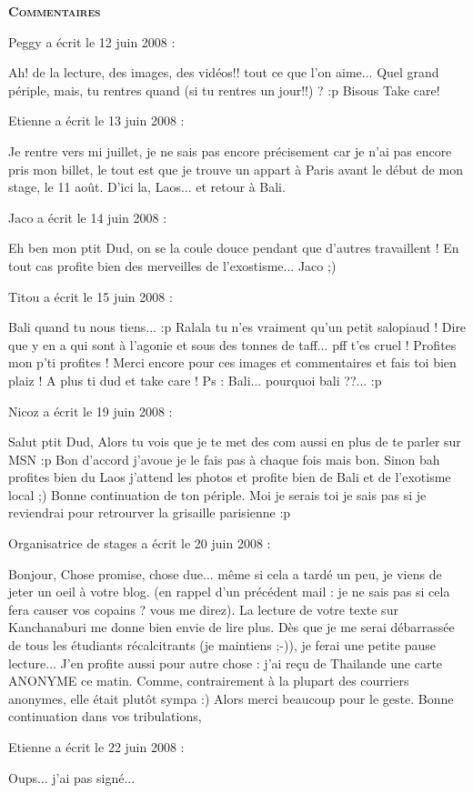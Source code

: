 \bigskip
\textbf{\textsc{Commentaires}}

\medskip
Peggy a écrit le 12 juin 2008 :
\begin{displayquote}
Ah! de la lecture, des images, des vidéos!! tout ce que l'on aime...
Quel grand périple, mais, tu rentres quand (si tu rentres un jour!!) ? :p
Bisous
Take care!
\end{displayquote}

\medskip
Etienne a écrit le 13 juin 2008 :
\begin{displayquote}
Je rentre vers mi juillet, je ne sais pas encore précisement car je n'ai pas encore pris mon billet, le tout est que je trouve un appart à Paris avant le début de mon stage, le 11 août.
D'ici la, Laos... et retour à Bali.
\end{displayquote}

\medskip
Jaco a écrit le 14 juin 2008 :
\begin{displayquote}
Eh ben mon ptit Dud, on se la coule douce pendant que d'autres travaillent !
En tout cas profite bien des merveilles de l'exostisme...
Jaco ;)
\end{displayquote}

\medskip
Titou a écrit le 15 juin 2008 :
\begin{displayquote}
Bali quand tu nous tiens... :p
Ralala tu n'es vraiment qu'un petit salopiaud ! Dire que y en a qui sont à l'agonie et sous des tonnes de taff... pff t'es cruel !
Profites mon p'ti profites !
Merci encore pour ces images et commentaires et fais toi bien plaiz !
A plus ti dud et take care !
Ps : Bali... pourquoi bali ??... :p
\end{displayquote}

\medskip
Nicoz a écrit le 19 juin 2008 :
\begin{displayquote}
Salut ptit Dud,
Alors tu vois que je te met des com aussi en plus de te parler sur MSN :p
Bon d'accord j'avoue je le fais pas à chaque fois mais bon.
Sinon bah profites bien du Laos j'attend les photos et profite bien de Bali et de l'exotisme local ;)
Bonne continuation de ton périple.
Moi je serais toi je sais pas si je reviendrai pour retrourver la grisaille parisienne :p
\end{displayquote}

\medskip
Organisatrice de stages a écrit le 20 juin 2008 :
\begin{displayquote}
Bonjour,
Chose promise, chose due... même si cela a tardé un peu, je viens de jeter un oeil à votre blog. (en rappel d'un précédent mail : je ne sais pas si cela fera causer vos copains ? vous me direz).
La lecture de votre texte sur Kanchanaburi me donne bien envie de lire plus. Dès que je me serai débarrassée de tous les étudiants récalcitrants (je maintiens ;-)), je ferai une petite pause lecture...
J'en profite aussi pour autre chose : j'ai reçu de Thailande une carte ANONYME ce matin. Comme, contrairement à la plupart des courriers anonymes, elle était plutôt sympa :) Alors merci beaucoup pour le geste.
Bonne continuation dans vos tribulations,
\end{displayquote}

\medskip
Etienne a écrit le 22 juin 2008 :
\begin{displayquote}
Oups... j'ai pas signé...
\end{displayquote}

\vfill
